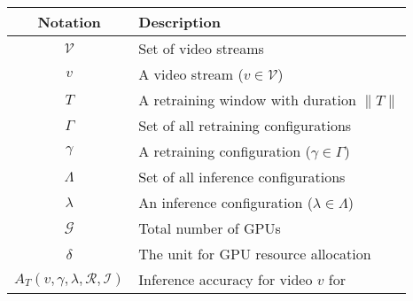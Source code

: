 
\begin{table}[t!]
   \centering
   \begin{tabular}{cl}
   {\bf Notation} & {\bf Description}\\\hline
   $\mathcal{V}$ & Set of video streams\\
   $v$ & A video stream ($v \in \mathcal{V}$)\\\hline
   $T$ & A retraining window with duration $\lVert T \rVert$ \\\hline
   $\Gamma$ & Set of all retraining configurations\\
   $\gamma$ & A retraining configuration ($\gamma \in \Gamma$)\\\hline
   $\Lambda$ & Set of all inference configurations\\
   $\lambda$ & An inference configuration ($\lambda \in \Lambda$)\\\hline
   $\mathcal{G}$ & Total number of GPUs\\
   $\delta$ & The unit for GPU resource allocation \\\hline
   $A_T(v, \gamma, \lambda, \mathcal{R}, \mathcal{I} )$ & Inference accuracy for video $v$ for\\%

\end{tabular}
\end{table}

